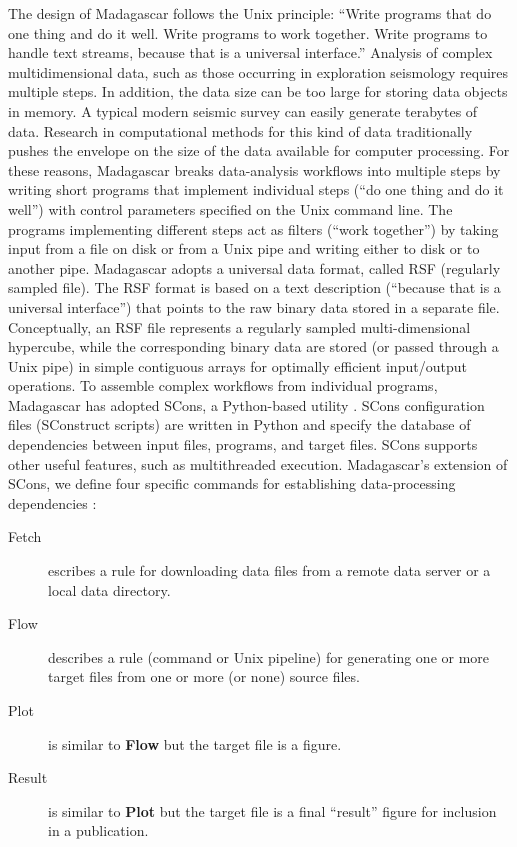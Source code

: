 The design of Madagascar follows the Unix principle: ``Write programs
that do one thing and do it well. Write programs to work
together. Write programs to handle text streams, because that is a
universal interface.'' \cite[]{salus1994quarter} Analysis of complex multidimensional data,
such as those occurring in exploration seismology requires multiple
steps. In addition, the data size can be too large for storing data
objects in memory. A typical modern seismic survey can easily generate
terabytes of data. Research in computational methods for this kind of
data traditionally pushes the envelope on the size of the data
available for computer processing. For these reasons, Madagascar
breaks data-analysis workflows into multiple steps by writing short
programs that implement individual steps (``do one thing and do it
well'') with control parameters specified on the Unix command
line. The programs implementing different steps act as filters (``work
together'') by taking input from a file on disk or from a Unix pipe
and writing either to disk or to another pipe. Madagascar adopts a universal
data format, called RSF (regularly sampled file). The RSF format is
based on a text description (``because that is a universal
interface'') that points to the raw binary data stored in a separate
file. Conceptually, an RSF file represents a regularly sampled
multi-dimensional hypercube, while the corresponding binary data are
stored (or passed through a Unix pipe) in simple contiguous arrays for
optimally efficient input/output operations.  To assemble complex
workflows from individual programs, Madagascar has adopted SCons, a
Python-based utility \cite[]{knight2005building}. SCons configuration files
(SConstruct scripts) are written in Python and specify the database of
dependencies between input files, programs, and target files. SCons
supports other useful features, such as multithreaded execution. Madagascar's extension of SCons, we define four specific commands for
establishing data-processing dependencies \cite[]{fomel2007reproducible}:
\begin{description}
\item[Fetch] escribes a rule for downloading data
files from a remote data server or a local data directory. 
\item[Flow] describes a rule (command or Unix pipeline) for
generating one or more target files from one or more (or none) source
files.
\item[Plot] is similar to \textbf{Flow} but the target file is a figure.  
\item[Result] is similar to \textbf{Plot} but the
target file is a final ``result'' figure for inclusion
in a publication.
\end{description}

